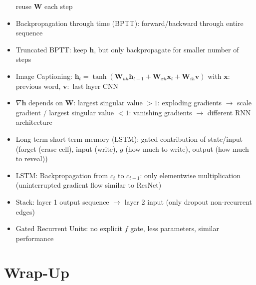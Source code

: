 \documentclass[11pt]{scrartcl}
\begin{document}
\begin{itemize}
        reuse \( \bm{W} \) each step
    \item Backpropagation through time (BPTT): forward/backward through entire sequence
    \item Truncated BPTT: keep \( \bm{h} \), but only backpropagate for smaller number of steps
    \item Image Captioning: \( \bm{h}_t = \tanh ( \bm{W}_{h h} \bm{h}_{t - 1} + \bm{W}_{x h} 
        \bm{x}_t + \bm{W}_{i h} \bm{v} ) \) with \( \bm{x}: \) previous word, \( \bm{v}: \) 
        last layer CNN 
    \item \( \nabla \bm{h} \) depends on \( \bm{W} \): largest singular value \( > 1 \): 
        exploding gradients \( \rightarrow \) scale gradient / largest singular value 
        \( < 1 \): vanishing gradients \( \rightarrow \) different RNN architecture
    \item Long-term short-term memory (LSTM): gated contribution of state/input (forget (erase 
        cell), input (write), \( g \) (how much to write), output (how much to reveal))
    \item LSTM: Backpropagation from \( c_t \) to \( c_{t - 1} \): only elementwise multiplication (uninterrupted gradient flow similar to ResNet)
    \item Stack: layer 1 output sequence \( \rightarrow \) layer 2 input (only dropout non-recurrent edges)
    \item Gated Recurrent Units: no explicit \( f \) gate, less parameters, similar performance
\end{itemize}

\section{Wrap-Up}
\end{document}
